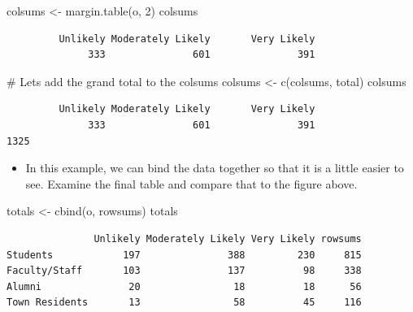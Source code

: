 \documentclass[
  letterpaper,
  DIV=11,
  numbers=noendperiod]{scrreprt}
\newenvironment{Shaded}{\begin{snugshade}}{\end{snugshade}}
\newcommand{\CommentTok}[1]{\textcolor[rgb]{0.37,0.37,0.37}{#1}}
\newcommand{\DecValTok}[1]{\textcolor[rgb]{0.68,0.00,0.00}{#1}}
\newcommand{\FunctionTok}[1]{\textcolor[rgb]{0.28,0.35,0.67}{#1}}
\newcommand{\NormalTok}[1]{\textcolor[rgb]{0.00,0.23,0.31}{#1}}
\newcommand{\OtherTok}[1]{\textcolor[rgb]{0.00,0.23,0.31}{#1}}
\providecommand{\tightlist}{%
  \setlength{\itemsep}{0pt}\setlength{\parskip}{0pt}}\usepackage{longtable,booktabs,array}
\begin{document}
\begin{Shaded}
\begin{Highlighting}[]
\NormalTok{colsums }\OtherTok{\textless{}{-}} \FunctionTok{margin.table}\NormalTok{(o, }\DecValTok{2}\NormalTok{)}
\NormalTok{colsums}
\end{Highlighting}
\end{Shaded}

\begin{verbatim}
         Unlikely Moderately Likely       Very Likely 
              333               601               391 
\end{verbatim}

\begin{Shaded}
\begin{Highlighting}[]
\CommentTok{\# Lets add the grand total to the colsums}
\NormalTok{colsums }\OtherTok{\textless{}{-}} \FunctionTok{c}\NormalTok{(colsums, total)}
\NormalTok{colsums}
\end{Highlighting}
\end{Shaded}

\begin{verbatim}
         Unlikely Moderately Likely       Very Likely                   
              333               601               391              1325 
\end{verbatim}

\begin{itemize}
\tightlist
\item
  In this example, we can bind the data together so that it is a little
  easier to see. Examine the final table and compare that to the figure
  above.
\end{itemize}

\begin{Shaded}
\begin{Highlighting}[]
\NormalTok{totals }\OtherTok{\textless{}{-}} \FunctionTok{cbind}\NormalTok{(o, rowsums)}
\NormalTok{totals}
\end{Highlighting}
\end{Shaded}

\begin{verbatim}
               Unlikely Moderately Likely Very Likely rowsums
Students            197               388         230     815
Faculty/Staff       103               137          98     338
Alumni               20                18          18      56
Town Residents       13                58          45     116
\end{verbatim}
\end{document}

